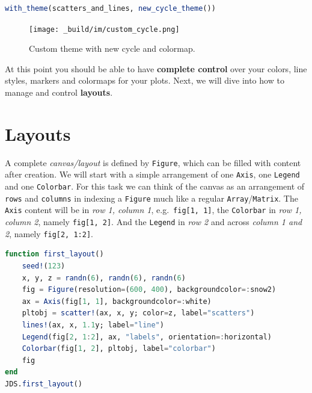 \documentclass[
  notoc %
]{tufte-book}
\newcommand{\passthrough}[1]{#1}
\begin{document}
\begin{lstlisting}[language=Julia]
with_theme(scatters_and_lines, new_cycle_theme())
\end{lstlisting}

\begin{figure}
\hypertarget{fig:custom_cycle}{%
\centering
\texttt{[image: \_build/im/custom\_cycle.png]}
\caption{Custom theme with new cycle and
colormap.}\label{fig:custom_cycle}
}
\end{figure}

At this point you should be able to have \textbf{complete control} over
your colors, line styles, markers and colormaps for your plots. Next, we
will dive into how to manage and control \textbf{layouts}.

\hypertarget{sec:makie_layouts}{%
\section{Layouts}\label{sec:makie_layouts}}

A complete \emph{canvas/layout} is defined by
\passthrough{\lstinline!Figure!}, which can be filled with content after
creation. We will start with a simple arrangement of one
\passthrough{\lstinline!Axis!}, one \passthrough{\lstinline!Legend!} and
one \passthrough{\lstinline!Colorbar!}. For this task we can think of
the canvas as an arrangement of \passthrough{\lstinline!rows!} and
\passthrough{\lstinline!columns!} in indexing a
\passthrough{\lstinline!Figure!} much like a regular
\passthrough{\lstinline!Array!}/\passthrough{\lstinline!Matrix!}. The
\passthrough{\lstinline!Axis!} content will be in \emph{row 1, column
1}, e.g.~\passthrough{\lstinline!fig[1, 1]!}, the
\passthrough{\lstinline!Colorbar!} in \emph{row 1, column 2}, namely
\passthrough{\lstinline!fig[1, 2]!}. And the
\passthrough{\lstinline!Legend!} in \emph{row 2} and across \emph{column
1 and 2}, namely \passthrough{\lstinline!fig[2, 1:2]!}.

\begin{lstlisting}[language=Julia]
function first_layout()
    seed!(123)
    x, y, z = randn(6), randn(6), randn(6)
    fig = Figure(resolution=(600, 400), backgroundcolor=:snow2)
    ax = Axis(fig[1, 1], backgroundcolor=:white)
    pltobj = scatter!(ax, x, y; color=z, label="scatters")
    lines!(ax, x, 1.1y; label="line")
    Legend(fig[2, 1:2], ax, "labels", orientation=:horizontal)
    Colorbar(fig[1, 2], pltobj, label="colorbar")
    fig
end
JDS.first_layout()
\end{lstlisting}
\end{document}
